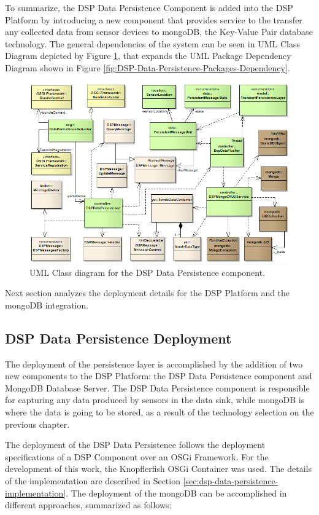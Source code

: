 To summarize, the DSP Data Persistence Component is added into the DSP Platform
by introducing a new component that provides service to the transfer any
collected data from sensor devices to mongoDB, the Key-Value Pair database
technology. The general dependencies of the system can be seen in UML
Class Diagram depicted by Figure \ref{fig:DSP-Data-Persistence-Classes}, that
expands the UML Package Dependency Diagram shown in Figure
\ref{fig:DSP-Data-Persistence-Packages-Dependency}.

\begin{figure}[!t]
  \centering
  \includegraphics[scale=0.65]{../diagrams/DSP-Data-Persistence-Classes}
  \caption{UML Class diagram for the DSP Data Persistence component.}
  \label{fig:DSP-Data-Persistence-Classes}
\end{figure}

Next section analyzes the deployment details for the DSP Platform and the
mongoDB integration.

\subsection{DSP Data Persistence Deployment}

The deployment of the persistence layer is accomplished by the addition of two
new components to the DSP Platform: the DSP Data Persistence component and MongoDB
Database Server. The DSP Data Persistence component is responsible for capturing 
any data produced by sensors in the data sink, while mongoDB is where the data is 
going to be stored, as a result of the technology selection on the previous chapter. 

The deployment of the DSP Data Persistence follows the deployment specifications
of a DSP Component over an OSGi Framework. For the development of this work,
the Knopflerfish OSGi Container \cite{knopflerfish} was used. The details of the
implementation are described in Section
\ref{sec:dsp-data-persistence-implementation}. The deployment of the mongoDB
can be accomplished in different approaches, summarized as follows:

